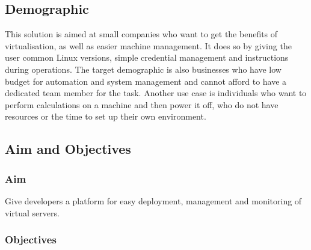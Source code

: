 \documentclass{article}
\begin{document}
\subsection{Demographic}
This solution is aimed at small companies who want to get the benefits of virtualisation, as well as easier machine management. It does so by giving the user common Linux versions, simple credential management and instructions during operations. The target demographic is also businesses who have low budget for automation and system management and cannot afford to have a dedicated team member for the task.
Another use case is individuals who want to perform calculations on a machine and then power it off, who do not have resources or the time to set up their own environment.

\subsection{Aim and Objectives}
\subsubsection{Aim}
Give developers a platform for easy deployment, management and monitoring of virtual servers.
\subsubsection{Objectives}
\end{document}
